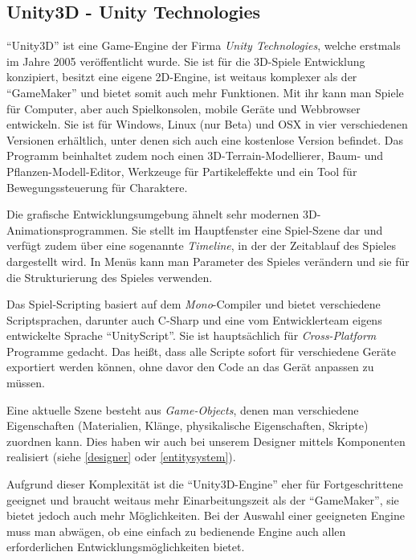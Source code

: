 \subsection{Unity3D - Unity Technologies}

"`Unity3D"' ist eine Game-Engine der Firma \textit{Unity Technologies}, welche erstmals im Jahre 2005 veröffentlicht wurde. Sie ist für die 3D-Spiele Entwicklung konzipiert, besitzt eine eigene 2D-Engine, ist weitaus komplexer als der "`GameMaker"' und bietet somit auch mehr Funktionen. 
Mit ihr kann man Spiele für Computer, aber auch Spielkonsolen, mobile Geräte und Webbrowser entwickeln. Sie ist für Windows, Linux (nur Beta) und OSX in vier verschiedenen Versionen erhältlich, unter denen sich auch eine kostenlose Version befindet. Das Programm beinhaltet zudem noch einen 3D-Terrain-Modellierer, Baum- und Pflanzen-Modell-Editor, Werkzeuge für Partikeleffekte und ein Tool für Bewegungssteuerung für Charaktere.

Die grafische Entwicklungsumgebung ähnelt sehr modernen 3D-Animationsprogrammen. Sie stellt im Hauptfenster eine Spiel-Szene dar und verfügt zudem über eine sogenannte \textit{Timeline}, in der der Zeitablauf des Spieles dargestellt wird. In Menüs kann man Parameter des Spieles verändern und sie für die Strukturierung des Spieles verwenden. 

Das Spiel-Scripting basiert auf dem \textit{Mono}-Compiler und bietet verschiedene Scriptsprachen, darunter auch C-Sharp und eine vom Entwicklerteam eigens entwickelte Sprache "`UnityScript"'. Sie ist hauptsächlich für \textit{Cross-Platform} Programme gedacht. Das heißt, dass alle Scripte sofort für verschiedene Geräte exportiert werden können, ohne davor den Code an das Gerät anpassen zu müssen.

Eine aktuelle Szene besteht aus \textit{Game-Objects}, denen man verschiedene Eigenschaften (Materialien, Klänge, physikalische Eigenschaften, Skripte) zuordnen kann. Dies haben wir auch bei unserem Designer mittels Komponenten realisiert (siehe \cref{designer} oder \cref{entitysystem}).

Aufgrund dieser Komplexität ist die "`Unity3D-Engine"' eher für Fortgeschrittene geeignet und braucht weitaus mehr Einarbeitungszeit als der "`GameMaker"', sie bietet jedoch auch mehr Möglichkeiten.
Bei der Auswahl einer geeigneten Engine muss man abwägen, ob eine einfach zu bedienende Engine auch allen erforderlichen Entwicklungsmöglichkeiten bietet.
